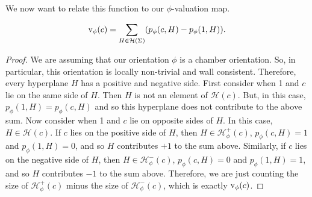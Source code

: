 \documentclass[11pt]{article}
\begin{document}
We now want to relate this function to our $\phi$-valuation map.

\begin{lemma}
    \[\textnormal{v}_\phi(c)=\sum_{H\in\mathcal{H}(\Sigma)}(p_{\phi}(c,H)-p_\phi(1,H)).\]
\end{lemma}

\begin{proof}
    We are assuming that our orientation $\phi$ is a chamber orientation. So, in particular, this orientation is locally non-trivial and wall consistent. Therefore, every hyperplane $H$ has a positive and negative side. First consider when 1 and $c$ lie on the same side of $H$. Then $H$ is not an element of $\mathcal{H}(c)$. But, in this case, $p_\phi(1,H)=p_\phi(c,H)$ and so this hyperplane does not contribute to the above sum. 
    Now consider when 1 and $c$ lie on opposite sides of $H$. In this case, $H\in \mathcal{H}(c)$. If $c$ lies on the positive side of $H$, then $H\in\mathcal{H}_{\phi}^+(c)$, $p_\phi(c,H)=1$ and $p_\phi(1,H)=0$, and so $H$ contributes $+1$ to the sum above. Similarly, if $c$ lies on the negative side of $H$, then $H\in\mathcal{H}_{\phi}^-(c)$, $p_\phi(c,H)=0$ and $p_\phi(1,H)=1$, and so $H$ contributes $-1$ to the sum above. Therefore, we are just counting the size of $\mathcal{H}_{\phi}^+(c)$ minus the size of $\mathcal{H}_{\phi}^-(c)$, which is exactly $\textnormal{v}_\phi(c)$. 
\end{proof}







\end{document}
